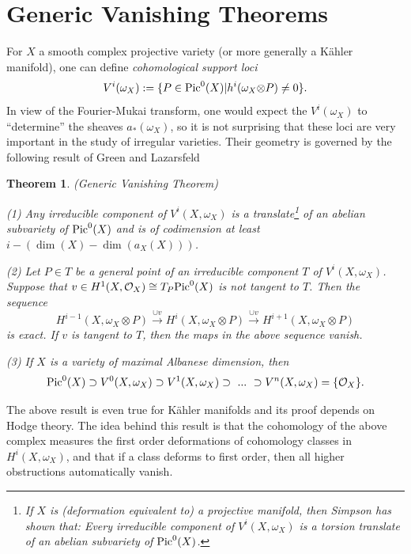 \documentclass[10pt]{amsart}
\newtheorem{thm}{Theorem}[section]
\newcommand\Pic{{\text{\rm Pic}}}
\newcommand\alb{{ a}}
\newcommand\ot{{\otimes}}
\newcommand\OO{{\mathcal{O}}}
\newcommand\HH{{\mathcal{H}}}
\newcommand\s{{ {\mathcal S}}}
\begin{document}
\newpage
 \section{Generic Vanishing Theorems}
For $X$ a smooth complex projective variety (or more generally a K\"ahler
manifold), one can define {\em cohomological support loci}  
$$V^i(\omega _X):=\{ P\in \Pic ^0(X)| h^i(\omega _X \ot P)\ne 0\}.$$
In view of the Fourier-Mukai transform, one would expect the $V^i(\omega _X)$
to ``determine'' the sheaves $\alb _* (\omega _X)$, so
it is not surprising that
these loci are very important in the study of irregular varieties.
Their geometry is governed by the following result of Green and Lazarsfeld
\cite{GL}
\begin{thm}\label{GVT}(Generic Vanishing Theorem) 

(1) Any irreducible component of $V^i(X,\omega _X )$ is a translate\footnote 
{If $X$ is 
(deformation equivalent to)
a projective manifold, then Simpson has shown that: {\it 
Every irreducible component of $V^i(X,\omega _X)$ is
a torsion translate of an abelian  subvariety of $\Pic ^0(X)$.}} of
an abelian subvariety of $\Pic ^0(X)$
and is of codimension at least
$i-(\dim (X) -\dim (\alb _X(X)))$.

(2) Let $P \in T$ be a general point of an irreducible component
$T$ of $V^i(X,\omega _X)$.
Suppose that $v
\in H^1(X, \OO
_X)\cong T_{P }\Pic ^0(X)$ is not tangent to $T$. Then the sequence
$$H^{i-1}(X,\omega _X \otimes P) \overset {\cup v}  {\longrightarrow}
H^{i}(X,\omega _X \otimes P)  \overset {\cup v}  {\longrightarrow }
H^{i+1}(X, \omega _X \otimes P) $$
is exact.
If $v$ is tangent to $T$, then the maps in the above sequence vanish.

(3) If $X$ is a variety of maximal Albanese dimension, then
$$\Pic ^0(X)\supset V^0(X,\omega _X )\supset V^1(X,\omega _X)
\supset \ ...\ \supset V^n(X,\omega _X )=\{ \OO _X\}.$$

\end{thm}
The above result is even true for K\"ahler manifolds and its proof
depends on Hodge theory. 
The idea behind this result is that the cohomology of the 
above complex measures
the first order deformations of cohomology classes in
$H^i(X,\omega _X)$, and that if a class deforms to first order, then
all higher obstructions automatically vanish.
\end{document}
